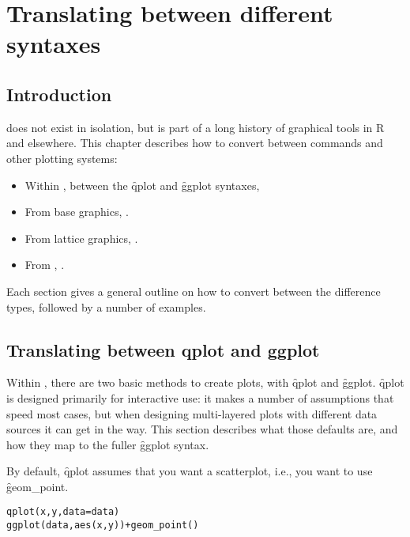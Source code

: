 
\chapter{Translating between different syntaxes}
\label{cha:translating}

\section{Introduction}

\ggplot does not exist in isolation, but is part of a long history of graphical tools in R and elsewhere.  This chapter describes how to convert between \ggplot commands and other plotting systems:

\begin{itemize}
  \item Within \ggplot, between the \f{qplot} and \f{ggplot} syntaxes, 
  
  \item From base graphics, .

  \item From lattice graphics, .
  
  \item From , .
\end{itemize} 

Each section gives a general outline on how to convert between the difference types, followed by a number of examples.

\section{Translating between qplot and ggplot}
\label{sec:qplot-ggplot}

Within \ggplot, there are two basic methods to create plots, with \f{qplot} and \f{ggplot}.  \f{qplot} is designed primarily for interactive use: it makes a number of assumptions that speed most cases, but when designing multi-layered plots with different data sources it can get in the way.  This section describes what those defaults are, and how they map to the fuller 
\f{ggplot} syntax.  

By default, \f{qplot} assumes that you want a scatterplot, i.e., you want to use \f{geom_point}.

\begin{alltt}
qplot(x, y, data = data)
ggplot(data, aes(x, y)) + geom_point()
\end{alltt}

